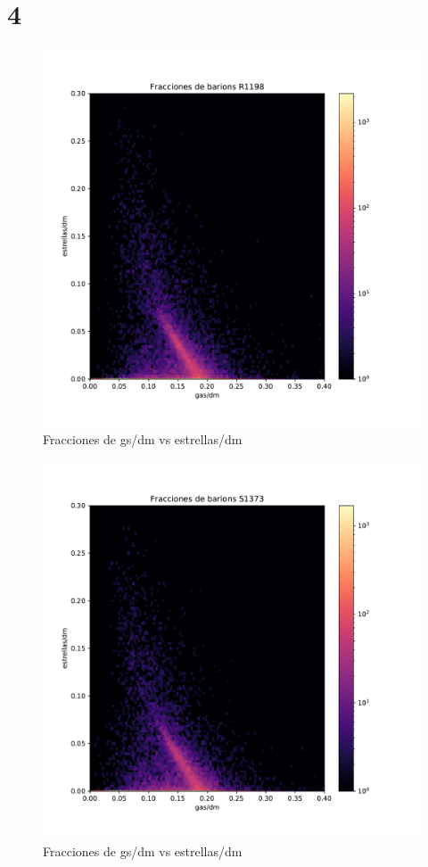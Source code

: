 \chapter{4}


\begin{figure}[h]
\centering
\includegraphics[width=18cm]{Figures/R1198_gas-est_frac.pdf}
\decoRule
\caption[Fraccione stellar vs gas]{Fracciones de gs/dm vs estrellas/dm }
\label{fig:Electron}
\end{figure}

\begin{figure}[h]
\centering
\includegraphics[width=18cm]{Figures/S1373_gas-est_frac.pdf}
\decoRule
\caption[Fraccione stellar vs gas]{Fracciones de gs/dm vs estrellas/dm }
\label{fig:Electron}
\end{figure}

